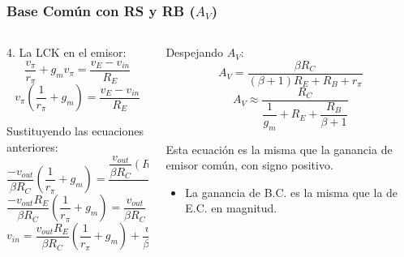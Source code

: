 \begin{frame}[t]
    \frametitle{Base Común con RS y RB ($A_V$)}

    \begin{columns}
        \begin{column}{0.6\textwidth}
            4. La LCK en el emisor:
            \[ \dfrac{v_\pi}{r_\pi} + g_m v_\pi = \dfrac{v_E - v_{in}}{R_E} \]
            \[ v_\pi \left(\dfrac{1}{r_\pi} + g_m \right) = \dfrac{v_E - v_{in}}{R_E} \]

            Sustituyendo las ecuaciones anteriores:
            \[ \dfrac{-v_{out}}{\beta R_C} \left(\dfrac{1}{r_\pi} + g_m \right) = \dfrac{\dfrac{v_{out}}{\beta R_C} (R_B + r_\pi) - v_{in}}{R_E} \]
            \[ \dfrac{-v_{out} R_E}{\beta R_C} \left(\dfrac{1}{r_\pi} + g_m \right) = \dfrac{v_{out}}{\beta R_C} (R_B + r_\pi) - v_{in} \]
            \[ v_{in} = \dfrac{v_{out} R_E}{\beta R_C} \left(\dfrac{1}{r_\pi} + g_m \right) + \dfrac{v_{out}}{\beta R_C} (R_B + r_\pi) \]
        \end{column}
        \begin{column}{0.4\textwidth}
            Despejando $A_V$:
            \[ A_V = \dfrac{\beta R_C}{(\beta+1)R_E + R_B + r_\pi} \]
            \[ \boxed{A_V \approx \dfrac{R_C}{\dfrac{1}{g_m} + R_E + \dfrac{R_B}{\beta+1}}} \]

            \vspace{3mm}
            Esta ecuación es la misma que la ganancia de emisor común, con signo positivo.

            \vspace{3mm}
            \begin{itemize}
                \item La ganancia de B.C. es la misma que la de E.C. en magnitud.
            \end{itemize}
        \end{column}
    \end{columns}
\end{frame}

